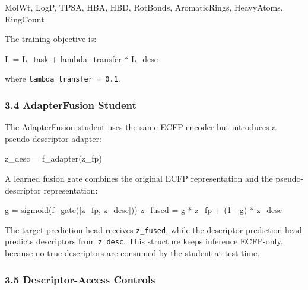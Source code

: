 \documentclass[
]{article}
\newenvironment{Shaded}{}{}
\newcommand{\NormalTok}[1]{#1}
\begin{document}
\begin{Shaded}
\begin{Highlighting}[]
\NormalTok{MolWt, LogP, TPSA, HBA, HBD, RotBonds, AromaticRings, HeavyAtoms, RingCount}
\end{Highlighting}
\end{Shaded}

The training objective is:

\begin{Shaded}
\begin{Highlighting}[]
\NormalTok{L = L\_task + lambda\_transfer * L\_desc}
\end{Highlighting}
\end{Shaded}

where \texttt{lambda\_transfer\ =\ 0.1}.

\subsubsection{3.4 AdapterFusion Student}\label{adapterfusion-student}

The AdapterFusion student uses the same ECFP encoder but introduces a
pseudo-descriptor adapter:

\begin{Shaded}
\begin{Highlighting}[]
\NormalTok{z\_desc = f\_adapter(z\_fp)}
\end{Highlighting}
\end{Shaded}

A learned fusion gate combines the original ECFP representation and the
pseudo-descriptor representation:

\begin{Shaded}
\begin{Highlighting}[]
\NormalTok{g = sigmoid(f\_gate([z\_fp, z\_desc]))}
\NormalTok{z\_fused = g * z\_fp + (1 {-} g) * z\_desc}
\end{Highlighting}
\end{Shaded}

The target prediction head receives \texttt{z\_fused}, while the
descriptor prediction head predicts descriptors from \texttt{z\_desc}.
This structure keeps inference ECFP-only, because no true descriptors
are consumed by the student at test time.

\subsubsection{3.5 Descriptor-Access
Controls}\label{descriptor-access-controls}
\end{document}
